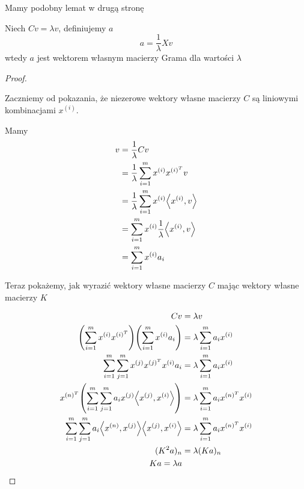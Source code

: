 Mamy podobny lemat w drugą stronę

\begin{lemma}
	Niech \( Cv = \lambda v \), definiujemy \( a \)
	\[
		a = \frac{1}{\lambda}Xv
	\]
	wtedy \( a \) jest wektorem własnym macierzy Grama dla wartości \( \lambda \)
\end{lemma}
\begin{proof} \( \)

	Zaczniemy od pokazania, że niezerowe wektory własne macierzy \( C \) są liniowymi kombinacjami \( x^{(i)} \).

	Mamy
	\begin{align*}
		v
		 & = \frac{1}{\lambda} Cv                                          \\
		 & = \frac{1}{\lambda} \sum_{i=1}^m x^{(i)} x^{(i)^T}v             \\
		 & = \frac{1}{\lambda} \sum_{i=1}^m x^{(i)}\dotproduct{x^{(i)}, v} \\
		 & = \sum_{i=1}^m x^{(i)}\frac{1}{\lambda}\dotproduct{x^{(i)}, v}  \\
		 & = \sum_{i=1}^m x^{(i)} a_i
	\end{align*}

	Teraz pokażemy, jak wyrazić wektory własne macierzy \( C \) mając wektory własne macierzy \( K \)

	\begin{align*}
		Cv                                                                                        & = \lambda v                                  \\
		\pars{\sum_{i=1}^m x^{(i)}x^{(i)^T}}\pars{\sum_{i=1}^m x^{(i)} a_i}                       & = \lambda \sum_{i=1}^m a_i x^{(i)}           \\
		\sum_{i=1}^m \sum_{j=1}^m x^{(j)}x^{(j)^T} x^{(i)} a_i                                    & = \lambda \sum_{i=1}^m a_i x^{(i)}           \\
		x^{(n)^T} \pars{\sum_{i=1}^m \sum_{j=1}^m a_i x^{(j)} \dotproduct{x^{(j)}, x^{(i)}} }     & = \lambda \sum_{i=1}^m a_i x^{(n)^T} x^{(i)} \\
		\sum_{i=1}^m \sum_{j=1}^m a_i \dotproduct{x^{(n)}, x^{(j)}} \dotproduct{x^{(j)}, x^{(i)}} & = \lambda \sum_{i=1}^m a_i x^{(n)^T} x^{(i)} \\
		(K^2a)_n                                                                                  & = \lambda (Ka)_n                             \\
		Ka = \lambda a
	\end{align*}
\end{proof}

